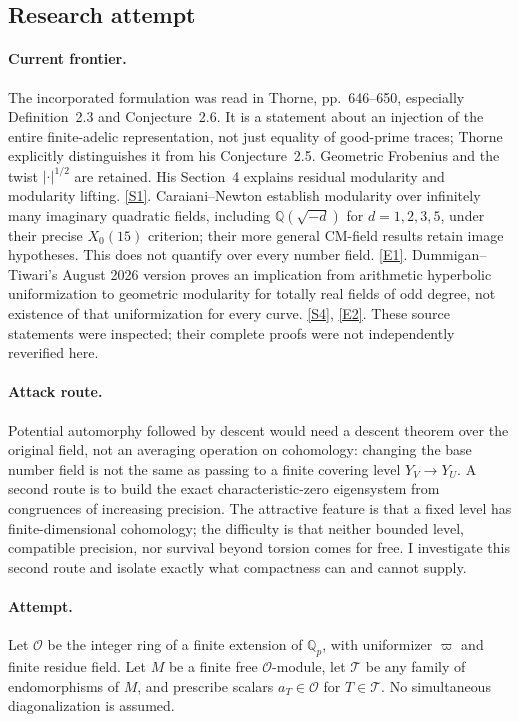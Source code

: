 \documentclass[11pt,a4paper]{article}
\newcommand{\Q}{\mathbb{Q}}
\newcommand{\sref}[2]{\hyperlink{source:#1:#2}{[S#2]}}
\newcommand{\eref}[2]{\hyperlink{extra:#1:#2}{[E#2]}}
\numberwithin{equation}{section}
\begin{document}
\subsection{Research attempt}

\paragraph{Current frontier.}
The incorporated formulation was read in Thorne, pp.~646--650, especially
Definition~2.3 and Conjecture~2.6. It is a statement about an injection of the
entire finite-adelic representation, not just equality of good-prime traces;
Thorne explicitly distinguishes it from his Conjecture~2.5. Geometric
Frobenius and the twist $|\cdot|^{1/2}$ are retained. His Section~4 explains
residual modularity and modularity lifting. \sref{39}{1}.
Caraiani--Newton establish modularity over infinitely many imaginary quadratic
fields, including $\Q(\sqrt{-d})$ for $d=1,2,3,5$, under their precise
$X_0(15)$ criterion; their more general CM-field results retain image
hypotheses. This does not quantify over every number field. \eref{39}{1}.
Dummigan--Tiwari's August 2026 version proves an implication from arithmetic
hyperbolic uniformization to geometric modularity for totally real fields of
odd degree, not existence of that uniformization for every curve.
\sref{39}{4}, \eref{39}{2}. These source statements were inspected; their
complete proofs were not independently reverified here.

\paragraph{Attack route.}
Potential automorphy followed by descent would need a descent theorem over the
original field, not an averaging operation on cohomology: changing the base
number field is not the same as passing to a finite covering level $Y_V\to Y_U$.
A second route is to build the exact characteristic-zero eigensystem from
congruences of increasing precision. The attractive feature is that a fixed
level has finite-dimensional cohomology; the difficulty is that neither
bounded level, compatible precision, nor survival beyond torsion comes for
free. I investigate this second route and isolate exactly what compactness
can and cannot supply.

\paragraph{Attempt.}
Let $\mathcal O$ be the integer ring of a finite extension of $\Q_p$, with
uniformizer $\varpi$ and finite residue field. Let $M$ be a finite free
$\mathcal O$-module, let $\mathcal T$ be any family of endomorphisms of $M$,
and prescribe scalars $a_T\in\mathcal O$ for $T\in\mathcal T$. No simultaneous
diagonalization is assumed.
\end{document}
